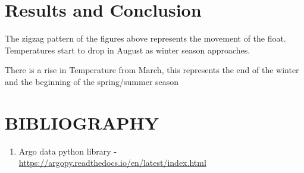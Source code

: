 \documentclass{article}
\begin{document}

\section{Results and Conclusion}
The zigzag pattern of the figures above represents the movement of the float. Temperatures start to  drop in August as winter season approaches.

There is a rise in Temperature from March, this represents the end of the winter and the beginning of the spring/summer season


\section{BIBLIOGRAPHY}



\begin{enumerate}
\item Argo data python library - \url{ https://argopy.readthedocs.io/en/latest/index.html}
\end{enumerate}

\end{document}
